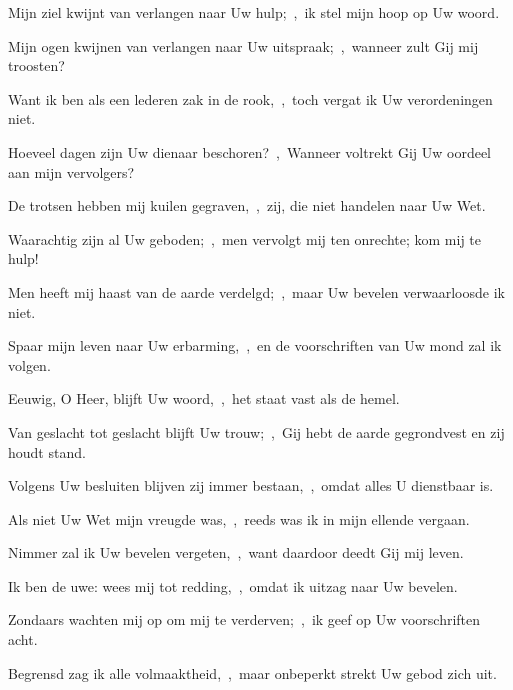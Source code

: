 \documentclass[12pt,twoside,a5paper]{article}
\begin{document}
\begin{halfparskip}
   Mijn ziel kwijnt van verlangen naar Uw hulp;~\sep\ ik stel mijn hoop op Uw woord.


  Mijn ogen kwijnen van verlangen naar Uw uitspraak;~\sep\ wanneer zult Gij mij troosten?

  Want ik ben als een lederen zak in de rook,~\sep\ toch vergat ik Uw verordeningen niet.

  Hoeveel dagen zijn Uw dienaar beschoren?~\sep\ Wanneer voltrekt Gij Uw oordeel aan mijn vervolgers?

  De trotsen hebben mij kuilen gegraven,~\sep\ zij, die niet handelen naar Uw Wet.

  Waarachtig zijn al Uw geboden;~\sep\ men vervolgt mij ten onrechte; kom mij te hulp!

  Men heeft mij haast van de aarde verdelgd;~\sep\ maar Uw bevelen verwaarloosde ik niet.

  Spaar mijn leven naar Uw erbarming,~\sep\ en de voorschriften van Uw mond zal ik volgen.
\end{halfparskip}





\begin{halfparskip}
   Eeuwig, O Heer, blijft Uw woord,~\sep\ het staat vast als de hemel.


  Van geslacht tot geslacht blijft Uw trouw;~\sep\ Gij hebt de aarde gegrondvest en zij houdt stand.

  Volgens Uw besluiten blijven zij immer bestaan,~\sep\ omdat alles U dienstbaar is.

  Als niet Uw Wet mijn vreugde was,~\sep\ reeds was ik in mijn ellende vergaan.

  Nimmer zal ik Uw bevelen vergeten,~\sep\ want daardoor deedt Gij mij leven.

  Ik ben de uwe: wees mij tot redding,~\sep\ omdat ik uitzag naar Uw bevelen.

  Zondaars wachten mij op om mij te verderven;~\sep\ ik geef op Uw voorschriften acht.

  Begrensd zag ik alle volmaaktheid,~\sep\ maar onbeperkt strekt Uw gebod zich uit.
\end{halfparskip}
\end{document}
